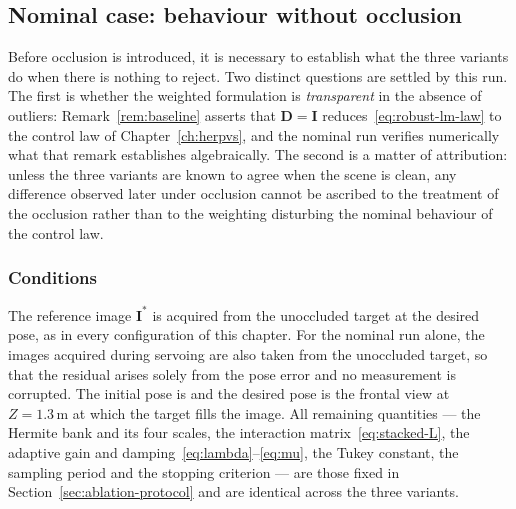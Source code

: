 %
%
%

\subsection{Nominal case: behaviour without occlusion}
\label{sec:nominal}

Before occlusion is introduced, it is necessary to establish what the three
variants do when there is nothing to reject. Two distinct questions are settled
by this run. The first is whether the weighted formulation is \emph{transparent}
in the absence of outliers: Remark~\ref{rem:baseline} asserts that
$\mathbf{D}=\mathbf{I}$ reduces~\eqref{eq:robust-lm-law} to the control law of
Chapter~\ref{ch:herpvs}, and the nominal run verifies numerically what that
remark establishes algebraically. The second is a matter of attribution: unless
the three variants are known to agree when the scene is clean, any difference
observed later under occlusion cannot be ascribed to the treatment of the
occlusion rather than to the weighting disturbing the nominal behaviour of the
control law.

\subsubsection*{Conditions}

The reference image $\mathbf{I}^{*}$ is acquired from the unoccluded target at
the desired pose, as in every configuration of this chapter. For the nominal run
alone, the images acquired during servoing are also taken from the unoccluded
target, so that the residual arises solely from the pose error and no
measurement is corrupted. The initial pose is
and the desired pose is the frontal view at $Z=1.3\,\mathrm{m}$ at which the
target fills the image. All remaining quantities --- the Hermite bank and its
four scales, the interaction matrix~\eqref{eq:stacked-L}, the adaptive gain and
damping~\eqref{eq:lambda}--\eqref{eq:mu}, the Tukey constant, the sampling
period and the stopping criterion --- are those fixed in
Section~\ref{sec:ablation-protocol} and are identical across the three variants.

